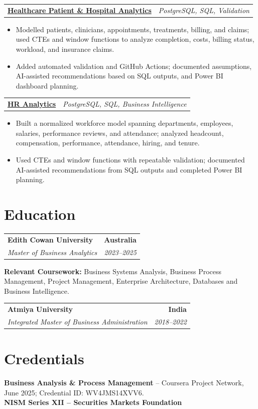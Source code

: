 \documentclass[letterpaper,10pt]{article}
\makeatletter
\newcommand{\role}[4]{%
  \begin{tabularx}{\textwidth}{@{}Xr@{}}
    \textbf{#1} & \textbf{#2} \\
    \textit{#3} & \textit{#4}
  \end{tabularx}\vspace{-1pt}
}
\newcommand{\project}[2]{%
  \begin{tabularx}{\textwidth}{@{}Xr@{}}
    \textbf{#1} & \textit{#2}
  \end{tabularx}\vspace{-1pt}
}
\makeatother
\begin{document}
\project{\href{https://github.com/jainalimehta/Healthcare-Analytics}{Healthcare Patient \& Hospital Analytics}}{PostgreSQL, SQL, Validation}
\begin{itemize}
  \item Modelled patients, clinicians, appointments, treatments, billing, and claims; used CTEs and window functions to analyze completion, costs, billing status, workload, and insurance claims.
  \item Added automated validation and GitHub Actions; documented assumptions, AI-assisted recommendations based on SQL outputs, and Power BI dashboard planning.
\end{itemize}
\vspace{1pt}

\project{\href{https://github.com/jainalimehta/HR-Analytics}{HR Analytics}}{PostgreSQL, SQL, Business Intelligence}
\begin{itemize}
  \item Built a normalized workforce model spanning departments, employees, salaries, performance reviews, and attendance; analyzed headcount, compensation, performance, attendance, hiring, and tenure.
  \item Used CTEs and window functions with repeatable validation; documented AI-assisted recommendations from SQL outputs and completed Power BI planning.
\end{itemize}

\section{Education}
\role{Edith Cowan University}{Australia}{Master of Business Analytics}{2023--2025}
\small\textbf{Relevant Coursework:} Business Systems Analysis, Business Process Management, Project Management, Enterprise Architecture, Databases and Business Intelligence.\\[2pt]
\role{Atmiya University}{India}{Integrated Master of Business Administration}{2018--2022}

\section{Credentials}
\small\textbf{Business Analysis \& Process Management} -- Coursera Project Network, June 2025; Credential ID: WV4JMS14XVV6.\\[-0.2pt]
\small\textbf{NISM Series XII -- Securities Markets Foundation}
\end{document}

